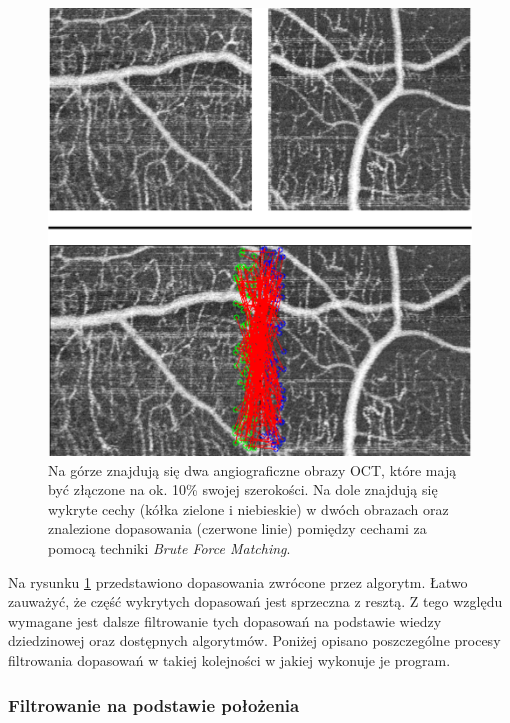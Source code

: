 \begin{figure}[htb]
  \centering
  \includegraphics[width=\textwidth]{gfx/no_filtering}
  \caption{Na górze znajdują się dwa angiograficzne obrazy OCT, które mają być złączone na ok. 10\% swojej szerokości. Na dole znajdują się wykryte cechy (kółka zielone i niebieskie) w dwóch obrazach oraz znalezione dopasowania (czerwone linie) pomiędzy cechami za pomocą techniki \textit{Brute Force Matching}.}
  \label{fig:proponowane_algorytmy:no_filtering}
\end{figure}

Na rysunku \ref{fig:proponowane_algorytmy:no_filtering} przedstawiono dopasowania zwrócone przez algorytm. Łatwo zauważyć, że część wykrytych dopasowań jest sprzeczna z resztą. Z tego względu wymagane jest dalsze filtrowanie tych dopasowań na podstawie wiedzy dziedzinowej oraz dostępnych algorytmów. Poniżej opisano poszczególne procesy filtrowania dopasowań w takiej kolejności w jakiej wykonuje je program.

\subsubsection{Filtrowanie na podstawie położenia}
\label{sec:proponowane_algorytmy:placement_filtering}

